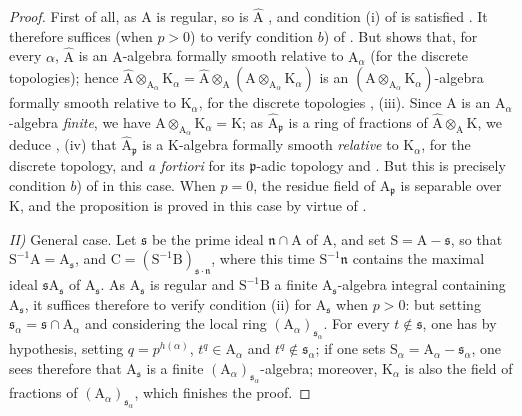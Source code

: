 \begin{proof}
First of all, as $\mathrm{A}$ is regular, so is $\widehat{\mathrm{A}}$ , and condition (i) of  is satisfied .
It therefore suffices (when $p>0$) to verify condition $b$) of .
But  shows that, for every $\alpha$, $\widehat{\mathrm{A}}$ is an $\mathrm{A}$-algebra formally smooth relative to $\mathrm{A}_\alpha$ (for the discrete topologies); hence $\widehat{\mathrm{A}}\otimes_{\mathrm{A}_\alpha}\mathrm{K}_\alpha=\widehat{\mathrm{A}}\otimes_\mathrm{A}(\mathrm{A}\otimes_{\mathrm{A}_\alpha}\mathrm{K}_\alpha)$ is an $(\mathrm{A}\otimes_{\mathrm{A}_\alpha}\mathrm{K}_\alpha)$-algebra formally smooth relative to $\mathrm{K}_\alpha$, for the discrete topologies , (iii).
Since $\mathrm{A}$ is an $\mathrm{A}_\alpha$-algebra \emph{finite}, we have $\mathrm{A}\otimes_{\mathrm{A}_\alpha}\mathrm{K}_\alpha=\mathrm{K}$; as $\widehat{\mathrm{A}}_\mathfrak{p}$ is a ring of fractions of $\widehat{\mathrm{A}}\otimes_\mathrm{A}\mathrm{K}$, we deduce , (iv) that $\widehat{\mathrm{A}}_\mathfrak{p}$ is a $\mathrm{K}$-algebra formally smooth \emph{relative} to $\mathrm{K}_\alpha$, for the discrete topology, and \emph{a fortiori} for its $\mathfrak{p}$-adic topology  and .
But this is precisely condition $b$) of  in this case.
When $p=0$, the residue field of $\widehat{\mathrm{A}}_\mathfrak{p}$ is separable over $\mathrm{K}$, and the proposition is proved in this case by virtue of .

\emph{II)} General case.
Let $\mathfrak{s}$ be the prime ideal $\mathfrak{n}\cap\mathrm{A}$ of $\mathrm{A}$, and set $\mathrm{S}=\mathrm{A}-\mathfrak{s}$, so that $\mathrm{S}^{-1}\mathrm{A}=\mathrm{A}_\mathfrak{s}$, and $\mathrm{C}=(\mathrm{S}^{-1}\mathrm{B})_{\mathfrak{s}\cdot\mathfrak{n}}$, where this time $\mathrm{S}^{-1}\mathfrak{n}$ contains the maximal ideal $\mathfrak{s}\mathrm{A}_\mathfrak{s}$ of $\mathrm{A}_\mathfrak{s}$.
As $\mathrm{A}_\mathfrak{s}$ is regular  and $\mathrm{S}^{-1}\mathrm{B}$ a finite $\mathrm{A}_\mathfrak{s}$-algebra integral containing $\mathrm{A}_\mathfrak{s}$, it suffices therefore to verify condition (ii) for $\mathrm{A}_\mathfrak{s}$ when $p>0$: but setting $\mathfrak{s}_\alpha=\mathfrak{s}\cap\mathrm{A}_\alpha$ and considering the local ring $(\mathrm{A}_\alpha)_{\mathfrak{s}_\alpha}$.
For every $t\notin\mathfrak{s}$, one has by hypothesis, setting $q=p^{h(\alpha)}$, $t^q\in\mathrm{A}_\alpha$ and $t^q\notin\mathfrak{s}_\alpha$; if one sets $\mathrm{S}_\alpha=\mathrm{A}_\alpha-\mathfrak{s}_\alpha$, one sees therefore that $\mathrm{A}_\mathfrak{s}$ is a finite $(\mathrm{A}_\alpha)_{\mathfrak{s}_\alpha}$-algebra; moreover, $\mathrm{K}_\alpha$ is also the field of fractions of $(\mathrm{A}_\alpha)_{\mathfrak{s}_\alpha}$, which finishes the proof.
\end{proof}

